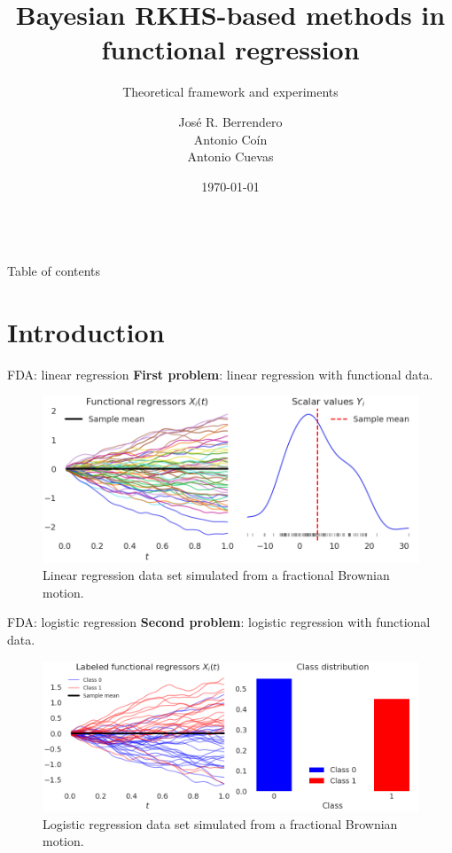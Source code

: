 \documentclass[10pt, english, professionalfonts]{beamer}
\title{Bayesian RKHS-based methods in functional regression}
\subtitle{Theoretical framework and experiments}
\date{\today\\ \\}
\author{José R. Berrendero \\ Antonio Coín  \\ Antonio Cuevas\\}
\institute{Universidad Autónoma de Madrid \\ \textit{Departamento de Matemáticas}}
\newcommand\maroon[1]{\color{mLightBrown}#1\color{mDarkTeal}}
\begin{document}
\maketitle

\begin{frame}{Table of contents}
   \tableofcontents
\end{frame}

\section{Introduction}

\begin{frame}{FDA: linear regression}
  \textbf{First problem}: \maroon{linear } regression with functional data.
  \vspace{1em}

\begin{figure}
    \includegraphics[width=\textwidth]{img/data_lin}
    \caption{Linear regression data set simulated from a fractional Brownian motion.}
  \end{figure}
  \vspace{-1em}
\end{frame}
\begin{frame}{FDA: logistic regression}
  \textbf{Second problem}: \maroon{logistic } regression with functional data.
\vspace{1em}

\begin{figure}
    \includegraphics[width=\textwidth]{img/data_log}
    \caption{Logistic regression data set simulated from a fractional Brownian motion.}
  \end{figure}
  \vspace{-1em}
\end{frame}
\end{document}
